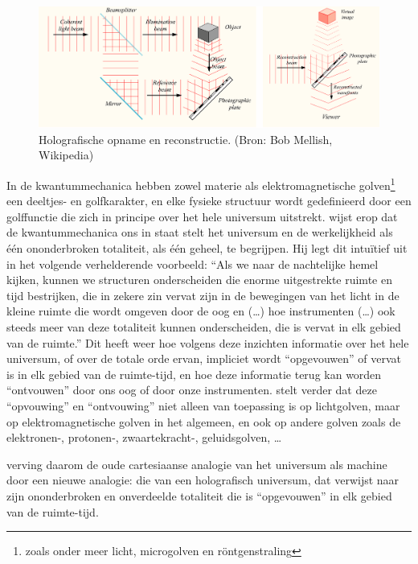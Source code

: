 \documentclass[
  11pt,
]{book}
\begin{document}
\begin{figure}

{\centering \includegraphics[width=1\linewidth]{./figs/holographySmall} 

}

\caption{Holografische opname en reconstructie. (Bron: Bob Mellish, Wikipedia)}\label{fig:hologram1}
\end{figure}

In de kwantummechanica hebben zowel materie als elektromagnetische golven\footnote{zoals onder meer licht, microgolven en röntgenstraling} een deeltjes- en golfkarakter, en elke fysieke structuur wordt gedefinieerd door een golffunctie die zich in principe over het hele universum uitstrekt. \citet{bohm1980} wijst erop dat de kwantummechanica ons in staat stelt het universum en de werkelijkheid als één ononderbroken totaliteit, als één geheel, te begrijpen. Hij legt dit intuïtief uit in het volgende verhelderende voorbeeld: ``Als we naar de nachtelijke hemel kijken, kunnen we structuren onderscheiden die enorme uitgestrekte ruimte en tijd bestrijken, die in zekere zin vervat zijn in de bewegingen van het licht in de kleine ruimte die wordt omgeven door de oog en (\ldots) hoe instrumenten (\ldots) ook steeds meer van deze totaliteit kunnen onderscheiden, die is vervat in elk gebied van de ruimte.'' Dit heeft weer hoe volgens deze inzichten informatie over het hele universum, of over de totale orde ervan, impliciet wordt ``opgevouwen'' of vervat is in elk gebied van de ruimte-tijd, en hoe deze informatie terug kan worden ``ontvouwen'' door ons oog of door onze instrumenten. \citet{bohm1980} stelt verder dat deze ``opvouwing'' en ``ontvouwing'' niet alleen van toepassing is op lichtgolven, maar op elektromagnetische golven in het algemeen, en ook op andere golven zoals de elektronen-, protonen-, zwaartekracht-, geluidsgolven, \ldots{}

\citet{bohm1980} verving daarom de oude cartesiaanse analogie van het universum als machine door een nieuwe analogie: die van een holografisch universum, dat verwijst naar zijn ononderbroken en onverdeelde totaliteit die is ``opgevouwen'' in elk gebied van de ruimte-tijd.
\end{document}
